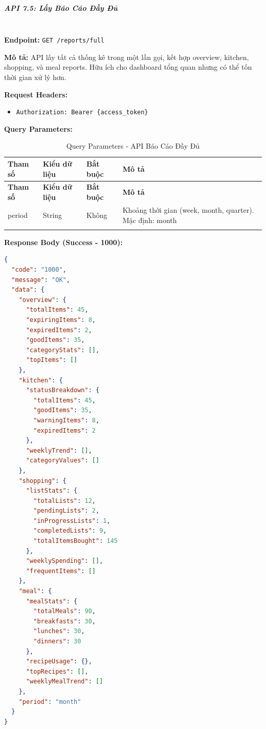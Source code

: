 \normalsize

\subparagraph{API 7.5: Lấy Báo Cáo Đầy Đủ}~\\

\textbf{Endpoint:} \texttt{GET /reports/full}

\textbf{Mô tả:} API lấy tất cả thống kê trong một lần gọi, kết hợp overview, kitchen, shopping, và meal reports. Hữu ích cho dashboard tổng quan nhưng có thể tốn thời gian xử lý hơn.

\textbf{Request Headers:}
\begin{itemize}
    \item \texttt{Authorization: Bearer \{access\_token\}}
\end{itemize}

\textbf{Query Parameters:}

\small
\begin{longtable}{|>{\raggedright\arraybackslash}p{3.5cm}|>{\raggedright\arraybackslash}p{2.5cm}|>{\raggedright\arraybackslash}p{2cm}|>{\raggedright\arraybackslash}p{5.5cm}|}
\hline
\textbf{Tham số} & \textbf{Kiểu dữ liệu} & \textbf{Bắt buộc} & \textbf{Mô tả} \\
\hline
\endfirsthead
\hline
\textbf{Tham số} & \textbf{Kiểu dữ liệu} & \textbf{Bắt buộc} & \textbf{Mô tả} \\
\hline
\endhead
period & String & Không & Khoảng thời gian (week, month, quarter). Mặc định: month \\
\hline
\caption{Query Parameters - API Báo Cáo Đầy Đủ}
\end{longtable}

\textbf{Response Body (Success - 1000):}

\begin{lstlisting}[language=json, caption=Response thanh cong API 7.5]
{
  "code": "1000",
  "message": "OK",
  "data": {
    "overview": {
      "totalItems": 45,
      "expiringItems": 8,
      "expiredItems": 2,
      "goodItems": 35,
      "categoryStats": [],
      "topItems": []
    },
    "kitchen": {
      "statusBreakdown": {
        "totalItems": 45,
        "goodItems": 35,
        "warningItems": 8,
        "expiredItems": 2
      },
      "weeklyTrend": [],
      "categoryValues": []
    },
    "shopping": {
      "listStats": {
        "totalLists": 12,
        "pendingLists": 2,
        "inProgressLists": 1,
        "completedLists": 9,
        "totalItemsBought": 145
      },
      "weeklySpending": [],
      "frequentItems": []
    },
    "meal": {
      "mealStats": {
        "totalMeals": 90,
        "breakfasts": 30,
        "lunches": 30,
        "dinners": 30
      },
      "recipeUsage": {},
      "topRecipes": [],
      "weeklyMealTrend": []
    },
    "period": "month"
  }
}
\end{lstlisting}

